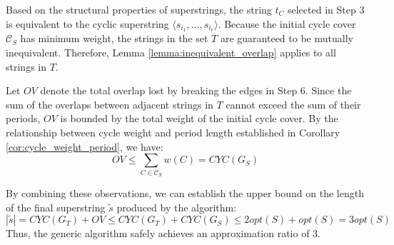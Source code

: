 Based on the structural properties of superstrings, the string $t_C$ selected in
Step 3 is equivalent to the cyclic superstring $\langle s_{i_1}, \dots, s_{i_r}
\rangle$. Because the initial cycle cover $\mathcal{C}_S$ has minimum weight,
the strings in the set $T$ are guaranteed to be mutually inequivalent.
Therefore, Lemma \ref{lemma:inequivalent_overlap} applies to all strings in $T$.

Let $OV$ denote the total overlap lost by breaking the edges in Step 6. Since
the sum of the overlaps between adjacent strings in $T$ cannot exceed the sum of
their periods, $OV$ is bounded by the total weight of the initial cycle cover.
By the relationship between cycle weight and period length established in
Corollary \ref{cor:cycle_weight_period}, we have:
\begin{equation}
OV \le \sum_{C \in \mathcal{C}_S} w(C) = CYC(G_S)
\end{equation}

By combining these observations, we can establish the upper bound on the length
of the final superstring $\tilde{s}$ produced by the algorithm:
\begin{equation}
|\tilde{s}| = CYC(G_T) + OV \le CYC(G_T) + CYC(G_S) \le 2opt(S) + opt(S) = 3opt(S)
\end{equation}
Thus, the generic algorithm safely achieves an approximation ratio of 3.
